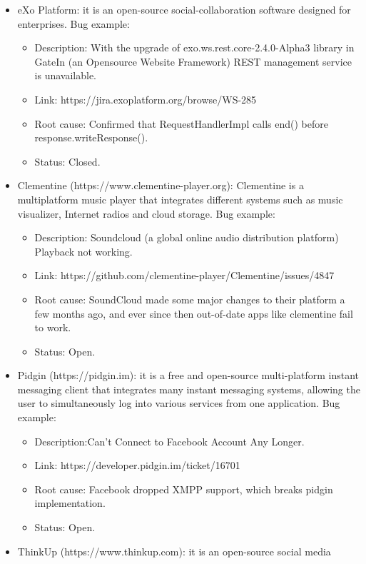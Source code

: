 \begin{itemize}
  \item eXo Platform: it is an open-source social-collaboration software
  designed for enterprises. Bug example:
  \begin{itemize}
    \item Description: With the upgrade of exo.ws.rest.core-2.4.0-Alpha3 library
    in GateIn (an Opensource Website Framework) REST management service is
    unavailable.
    \item Link: https://jira.exoplatform.org/browse/WS-285
    \item Root cause: Confirmed that RequestHandlerImpl calls end() before
    response.writeResponse().
    \item Status: Closed.
  \end{itemize}
  \item Clementine (https://www.clementine-player.org): Clementine is a
  multiplatform music player that integrates different systems such as music visualizer, Internet radios and cloud
  storage. Bug example:
  \begin{itemize}
    \item Description: Soundcloud (a global online audio distribution platform)
    Playback not working.
    \item Link: https://github.com/clementine-player/Clementine/issues/4847
    \item Root cause: SoundCloud made some major changes to their platform a few
    months ago, and ever since then out-of-date apps like clementine fail to work.
    \item Status: Open.
  \end{itemize}
  \item Pidgin (https://pidgin.im): it is a free and
  open-source multi-platform instant messaging client that integrates many
  instant messaging systems, allowing the user to simultaneously log into
  various services from one application.  Bug example:
  \begin{itemize}
    \item Description:Can't Connect to Facebook Account Any Longer.
    \item Link: https://developer.pidgin.im/ticket/16701
    \item Root cause: Facebook dropped XMPP support, which breaks pidgin implementation.
    \item Status: Open.
  \end{itemize}
  \item ThinkUp (https://www.thinkup.com): it is an open-source social media

\end{itemize}
